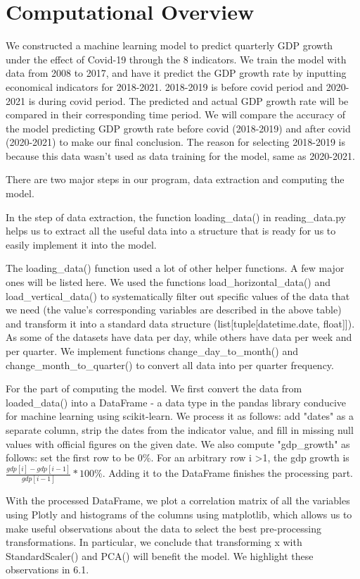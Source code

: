 \documentclass{article}
\begin{document}
\section{Computational Overview}  
We constructed a machine learning model to predict quarterly GDP growth under the effect of Covid-19 through the 8 indicators. We train the model with data from 2008 to 2017, and have it predict the GDP growth rate by inputting economical indicators for 2018-2021. 2018-2019 is before covid period and 2020-2021 is during covid period. The predicted and actual GDP growth rate will be compared in their corresponding time period. We will compare the accuracy of the model predicting GDP growth rate before covid (2018-2019) and after covid (2020-2021) to make our final conclusion. The reason for selecting 2018-2019 is because this data wasn’t used as data training for the model, same as 2020-2021. 

There are two major steps in our program, data extraction and computing the model. 

In the step of data extraction, the function loading\_data() in reading\_data.py helps us to extract all the useful data into a structure that is ready for us to easily implement it into the model. 

The loading\_data() function used a lot of other helper functions. A few major ones will be listed here. We used the functions load\_horizontal\_data() and load\_vertical\_data() to systematically filter out specific values of the data that we need (the value’s corresponding variables are described in the above table) and transform it into a standard data structure (list[tuple[datetime.date, float]]). As some of the datasets have data per day, while others have data per week and per quarter. We implement functions change\_day\_to\_month() and change\_month\_to\_quarter() to convert all data into per quarter frequency. 

For the part of computing the model. We first convert the data from loaded\_data() into a DataFrame - a data type in the pandas library conducive for machine learning using scikit-learn. We process it as follows: add "dates" as a separate column, strip the dates from the indicator value, and fill in missing null values with official figures on the given date. We also compute "gdp\_growth" as follows: set the first row to be 0\%. For an arbitrary row i >1, the gdp growth is $\frac{gdp[i]-gdp[i-1]}{gdp[i-1]}*100$\%. Adding it to the DataFrame finishes the processing part.

With the processed DataFrame, we plot a correlation matrix of all the variables using Plotly and histograms of the columns using matplotlib, which allows us to make useful observations about the data to select the best pre-processing transformations. In particular, we conclude that transforming x with StandardScaler() and PCA() will benefit the model. We highlight these observations in 6.1.
\end{document}
